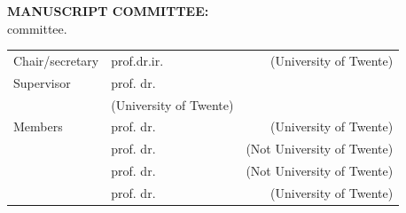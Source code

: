 \begin{titlepage}
\clearpage
\thispagestyle{empty}
\raggedright
\normalsize
\textbf{MANUSCRIPT COMMITTEE:}\\[2\baselineskip]
committee.
\begin{table}[hb]
	\begin{tabular}{llr}
		Chair/secretary  & prof.dr.ir.  &   (University of Twente)    \\
		Supervisor          & prof. dr. \\        &  (University of Twente)   \\ 
		Members             & prof. dr.&  (University of Twente)   \\                                                                     
		& prof. dr.  &  (Not University of Twente)   \\  
		& prof. dr. &  (Not University of Twente)   \\  
		& prof. dr.  &  (University of Twente)   \\  		
	\end{tabular}
\end{table}

\end{titlepage}
